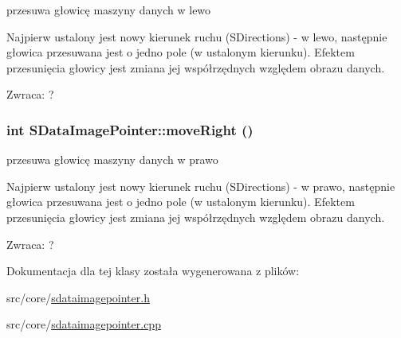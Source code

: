 przesuwa głowicę maszyny danych w lewo 

Najpierw ustalony jest nowy kierunek ruchu (SDirections) - w lewo, następnie głowica przesuwana jest o jedno pole (w ustalonym kierunku). Efektem przesunięcia głowicy jest zmiana jej współrzędnych względem obrazu danych. \begin{Desc}
\item[Zwraca:]? \end{Desc}
\hypertarget{classSDataImagePointer_9cc51881224c9e157e96d5e36189e54a}{
\subsubsection[{moveRight}]{\setlength{\rightskip}{0pt plus 5cm}int SDataImagePointer::moveRight ()}}
\label{classSDataImagePointer_9cc51881224c9e157e96d5e36189e54a}


przesuwa głowicę maszyny danych w prawo 

Najpierw ustalony jest nowy kierunek ruchu (SDirections) - w prawo, następnie głowica przesuwana jest o jedno pole (w ustalonym kierunku). Efektem przesunięcia głowicy jest zmiana jej współrzędnych względem obrazu danych. \begin{Desc}
\item[Zwraca:]? \end{Desc}


Dokumentacja dla tej klasy została wygenerowana z plików:\begin{CompactItemize}
\item 
src/core/\hyperlink{sdataimagepointer_8h}{sdataimagepointer.h}\item 
src/core/\hyperlink{sdataimagepointer_8cpp}{sdataimagepointer.cpp}\end{CompactItemize}

